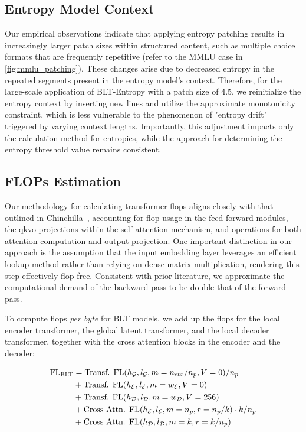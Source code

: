 \subsection{Entropy Model Context}
\label{section:entropy-context}
Our empirical observations indicate that applying entropy patching results in increasingly larger patch sizes within structured content, such as multiple choice formats that are frequently repetitive (refer to the MMLU case in \autoref{fig:mmlu_patching}). These changes arise due to decreased entropy in the repeated segments present in the entropy model's context. Therefore, for the large-scale application of {\textsc BLT}-Entropy with a patch size of 4.5, we reinitialize the entropy context by inserting new lines and utilize the approximate monotonicity constraint, which is less vulnerable to the phenomenon of "entropy drift" triggered by varying context lengths. Importantly, this adjustment impacts only the calculation method for entropies, while the approach for determining the entropy threshold value remains consistent.

\subsection{FLOPs Estimation} 
\label{section:flops}

Our methodology for calculating transformer flops aligns closely with that outlined in Chinchilla~\citep{hoffmann2022training}, accounting for flop usage in the feed-forward modules, the qkvo projections within the self-attention mechanism, and operations for both attention computation and output projection. One important distinction in our approach is the assumption that the input embedding layer leverages an efficient lookup method rather than relying on dense matrix multiplication, rendering this step effectively flop-free. Consistent with prior literature, we approximate the computational demand of the backward pass to be double that of the forward pass.

To compute flops \textit{per byte} for {\textsc BLT} models, we add up the flops for the local encoder transformer, the global latent transformer, and the local decoder transformer, together with the cross attention blocks in the encoder and the decoder:

\begin{align}
    \text{FL}_{\text{{\textsc BLT}}} &= \text{Transf. FL}(h_{\mathcal{G}}, l_{\mathcal{G}}, m=n_{ctx}/n_p, V=0) / n_p\\
    &+ \text{Transf. FL}(h_{\mathcal{E}}, l_{\mathcal{E}}, m=w_{\mathcal{E}}, V=0) \\
    &+ \text{Transf. FL}(h_{\mathcal{D}}, l_{\mathcal{D}}, m=w_{\mathcal{D}}, V=256) \\ 
    &+ \text{Cross Attn. FL}(h_{\mathcal{E}}, l_{\mathcal{E}}, m=n_p, r=n_p/k) \cdot k/n_p \\ 
    &+ \text{Cross Attn. FL}(h_{\mathcal{D}}, l_{\mathcal{D}}, m=k, r=k/n_p)
\end{align}

